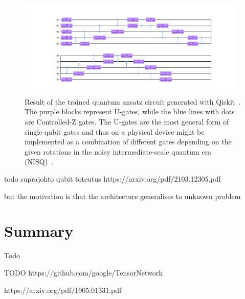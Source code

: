 \begin{figure}[htb]
    \centering

    \includegraphics[width=0.97\textwidth]{figures/ansatz_circuit.pdf}

    \caption{Result of the trained quantum ansatz circuit generated with Qiskit~\cite{Qiskit}. The purple blocks represent U-gates, while the blue lines with dots are Controlled-Z gates. The U-gates are the most general form of single-qubit gates and thus on a physical device might be implemented as a combination of different gates depending on the given rotations in the noisy intermediate-scale quantum era (NISQ)~\cite{Li2020}.}
    \label{fig:qasm_circuit}
\end{figure}



todo suprajohto qubit toteutus
https://arxiv.org/pdf/2103.12305.pdf




but the motivation is that the architecture generalises to unknown problem

\section{Summary}

Todo





TODO https://github.com/google/TensorNetwork

https://arxiv.org/pdf/1905.01331.pdf


\newpage
\pagestyle{plain}
\setlength{}
\renewcommand*{\bibfont}{\footnotesize}
\printbibliography{}



